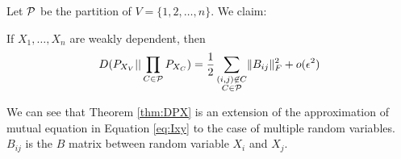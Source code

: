 Let $\P$ be the partition of $V=\{1,2,\dots, n\}$. We claim:
\begin{theorem}\label{thm:DPX}
If $X_1, \dots, X_n$ are weakly dependent, then
\begin{equation}\label{eq:PXV}
D(P_{X_V} || \prod_{C\in \P} P_{X_{C}}) = {1 \over 2}\sum_{\substack{(i,j) \not\in C\\ C\in \P}} \norm{B_{ij}}_F^2 + o(\epsilon^2)
\end{equation}
\end{theorem}
We can see that Theorem \ref{thm:DPX} is an extension of the approximation of mutual equation in Equation \eqref{eq:Ixy} to the case of multiple random variables.
$B_{ij}$ is the $B$ matrix between random variable $X_i$ and $X_j$.

